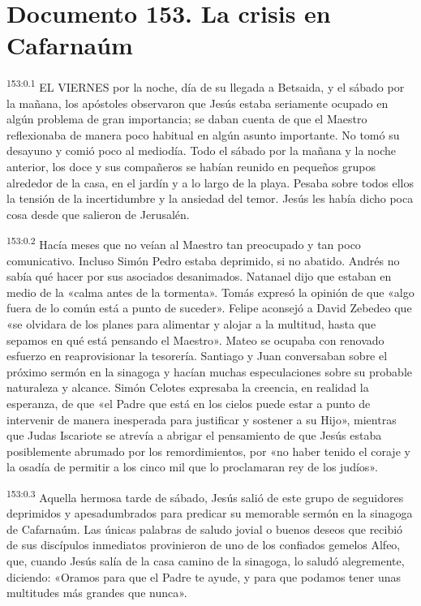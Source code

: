 \chapter{Documento 153. La crisis en Cafarnaúm}
\par 
\textsuperscript{153:0.1} EL VIERNES por la noche, día de su llegada a Betsaida, y el sábado por la mañana, los apóstoles observaron que Jesús estaba seriamente ocupado en algún problema de gran importancia; se daban cuenta de que el Maestro reflexionaba de manera poco habitual en algún asunto importante. No tomó su desayuno y comió poco al mediodía. Todo el sábado por la mañana y la noche anterior, los doce y sus compañeros se habían reunido en pequeños grupos alrededor de la casa, en el jardín y a lo largo de la playa. Pesaba sobre todos ellos la tensión de la incertidumbre y la ansiedad del temor. Jesús les había dicho poca cosa desde que salieron de Jerusalén.

\par 
\textsuperscript{153:0.2} Hacía meses que no veían al Maestro tan preocupado y tan poco comunicativo. Incluso Simón Pedro estaba deprimido, si no abatido. Andrés no sabía qué hacer por sus asociados desanimados. Natanael dijo que estaban en medio de la «calma antes de la tormenta». Tomás expresó la opinión de que «algo fuera de lo común está a punto de suceder». Felipe aconsejó a David Zebedeo que «se olvidara de los planes para alimentar y alojar a la multitud, hasta que sepamos en qué está pensando el Maestro». Mateo se ocupaba con renovado esfuerzo en reaprovisionar la tesorería. Santiago y Juan conversaban sobre el próximo sermón en la sinagoga y hacían muchas especulaciones sobre su probable naturaleza y alcance. Simón Celotes expresaba la creencia, en realidad la esperanza, de que «el Padre que está en los cielos puede estar a punto de intervenir de manera inesperada para justificar y sostener a su Hijo», mientras que Judas Iscariote se atrevía a abrigar el pensamiento de que Jesús estaba posiblemente abrumado por los remordimientos, por «no haber tenido el coraje y la osadía de permitir a los cinco mil que lo proclamaran rey de los judíos».

\par 
\textsuperscript{153:0.3} Aquella hermosa tarde de sábado, Jesús salió de este grupo de seguidores deprimidos y apesadumbrados para predicar su memorable sermón en la sinagoga de Cafarnaúm. Las únicas palabras de saludo jovial o buenos deseos que recibió de sus discípulos inmediatos provinieron de uno de los confiados gemelos Alfeo, que, cuando Jesús salía de la casa camino de la sinagoga, lo saludó alegremente, diciendo: «Oramos para que el Padre te ayude, y para que podamos tener unas multitudes más grandes que nunca».

